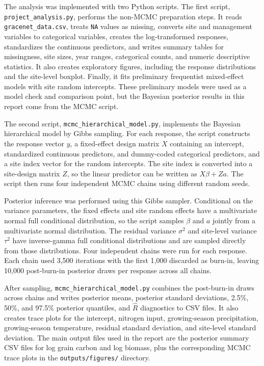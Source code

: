 \documentclass[11pt]{article}
\begin{document}
The analysis was implemented with two Python scripts. The first script, \texttt{project\_analysis.py}, performs the non-MCMC preparation steps. It reads \texttt{gracenet\_data.csv}, treats \texttt{NA} values as missing, converts site and management variables to categorical variables, creates the log-transformed responses, standardizes the continuous predictors, and writes summary tables for missingness, site sizes, year ranges, categorical counts, and numeric descriptive statistics. It also creates exploratory figures, including the response distributions and the site-level boxplot. Finally, it fits preliminary frequentist mixed-effect models with site random intercepts. These preliminary models were used as a model check and comparison point, but the Bayesian posterior results in this report come from the MCMC script.

The second script, \texttt{mcmc\_\allowbreak hierarchical\_\allowbreak model.py}, implements the Bayesian hierarchical model by Gibbs sampling. For each response, the script constructs the response vector $y$, a fixed-effect design matrix $X$ containing an intercept, standardized continuous predictors, and dummy-coded categorical predictors, and a site index vector for the random intercepts. The site index is converted into a site-design matrix $Z$, so the linear predictor can be written as $X\beta + Za$. The script then runs four independent MCMC chains using different random seeds.

Posterior inference was performed using this Gibbs sampler. Conditional on the variance parameters, the fixed effects and site random effects have a multivariate normal full conditional distribution, so the script samples $\beta$ and $a$ jointly from a multivariate normal distribution. The residual variance $\sigma^2$ and site-level variance $\tau^2$ have inverse-gamma full conditional distributions and are sampled directly from those distributions. Four independent chains were run for each response. Each chain used 3,500 iterations with the first 1,000 discarded as burn-in, leaving 10,000 post-burn-in posterior draws per response across all chains.

After sampling, \texttt{mcmc\_\allowbreak hierarchical\_\allowbreak model.py} combines the post-burn-in draws across chains and writes posterior means, posterior standard deviations, 2.5\%, 50\%, and 97.5\% posterior quantiles, and $\hat{R}$ diagnostics to CSV files. It also creates trace plots for the intercept, nitrogen input, growing-season precipitation, growing-season temperature, residual standard deviation, and site-level standard deviation. The main output files used in the report are the posterior summary CSV files for log grain carbon and log biomass, plus the corresponding MCMC trace plots in the \texttt{outputs/figures/} directory.
\end{document}
